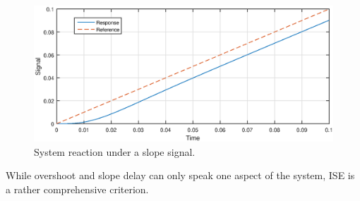\begin{figure}[ht]
  \begin{center}
    \includegraphics[width=\linewidth]{Plots/slope_delay1.eps}
  \end{center}
  \caption{System reaction under a slope signal.}
  \label{fig:slope}
\end{figure}

While overshoot and slope delay can only speak one aspect of the system, ISE is a rather comprehensive criterion. 

